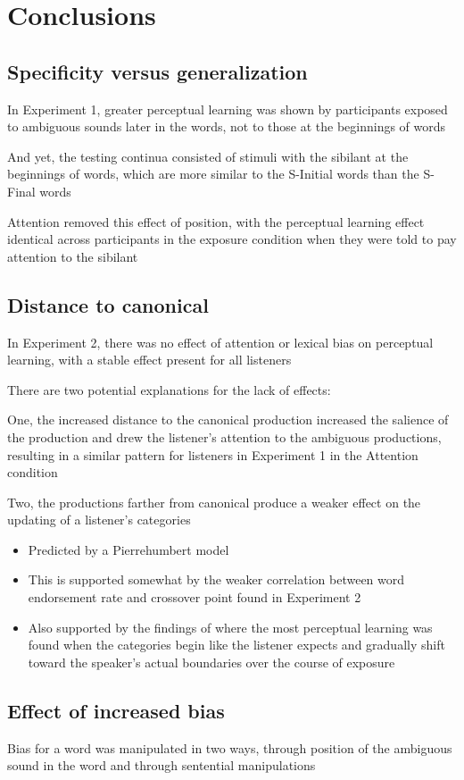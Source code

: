 
\chapter{Conclusions}


\section{Specificity versus generalization}

In Experiment 1, greater perceptual learning was shown by participants exposed to ambiguous sounds later in the words, not to those at the beginnings of words

And yet, the testing continua consisted of stimuli with the sibilant at the beginnings of words, which are more similar to the S-Initial words than the S-Final words

Attention removed this effect of position, with the perceptual learning effect identical across participants in the exposure condition when they were told to pay attention to the sibilant

\section{Distance to canonical}

In Experiment 2, there was no effect of attention or lexical bias on perceptual learning, with a stable effect present for all listeners

There are two potential explanations for the lack of effects:

One, the increased distance to the canonical production increased the salience of the production and drew the listener's attention to the ambiguous productions, resulting in a similar pattern for listeners in Experiment 1 in the Attention condition

Two, the productions farther from canonical produce a weaker effect on the updating of a listener's categories

\begin{itemize}
\item Predicted by a Pierrehumbert model

\item This is supported somewhat by the weaker correlation between word endorsement rate and crossover point found in Experiment 2
	
\item Also supported by the findings of \citet{Sumner2011} where the most perceptual learning was found when the categories begin like the listener expects and gradually shift toward the speaker's actual boundaries over the course of exposure
\end{itemize}

\section{Effect of increased bias}

Bias for a word was manipulated in two ways, through position of the ambiguous sound in the word and through sentential manipulations

